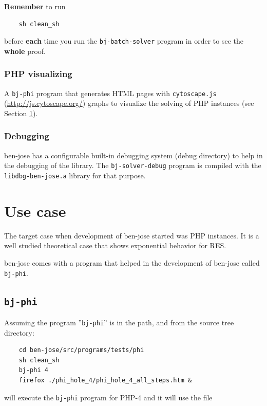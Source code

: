 \documentclass{easychair}
\newcommand{\bjphi}{\texttt{bj-phi}}
\newcommand{\bjbatchsolver}{\texttt{bj-batch-solver}}
\begin{document}
\textbf{Remember} to run

\begin{verbatim}
	sh clean_sh
\end{verbatim}

before \textbf{each} time you run the {\bjbatchsolver} program in order to see the \textbf{whole} proof.

\subsubsection{PHP visualizing}

A {\bjphi} program that generates HTML pages with \texttt{cytoscape.js} (\url{http://js.cytoscape.org/}) graphs to visualize the solving of PHP instances (see Section \ref{sect:use-case}).

\subsubsection{Debugging}

ben-jose has a configurable built-in debugging system (debug directory) to help in the debugging of the library. The \texttt{bj-solver-debug} program is compiled with the \texttt{libdbg-ben-jose.a} library for that purpose.


\section{Use case}
\label{sect:use-case}

The target case when development of ben-jose started was PHP instances. It is a well studied theoretical case that shows exponential behavior for RES.

ben-jose comes with a program that helped in the development of ben-jose called {\bjphi}.

\subsection{\bjphi}

Assuming the program ''{\bjphi}'' is in the path, and from the source tree directory:

\begin{verbatim}
	cd ben-jose/src/programs/tests/phi
	sh clean_sh
	bj-phi 4
	firefox ./phi_hole_4/phi_hole_4_all_steps.htm &
\end{verbatim}

will execute the {\bjphi} program for PHP-4 and it will use the file 
\end{document}

